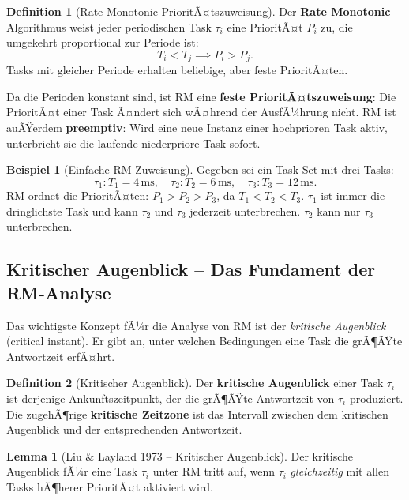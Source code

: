 ﻿\documentclass[a4paper,12pt]{report}
\theoremstyle{definition}
\newtheorem{definition}{Definition}[chapter]
\newtheorem{beispiel}{Beispiel}[chapter]
\newtheorem{lemma}{Lemma}[chapter]
\begin{document}
\begin{definition}[Rate Monotonic PrioritÃ¤tszuweisung]
	Der \textbf{Rate Monotonic} Algorithmus weist jeder periodischen Task $\tau_i$
	eine PrioritÃ¤t $P_i$ zu, die umgekehrt proportional zur Periode ist:
	\[
		T_i < T_j \implies P_i > P_j.
	\]
	Tasks mit gleicher Periode erhalten beliebige, aber feste PrioritÃ¤ten.
\end{definition}

Da die Perioden konstant sind, ist RM eine \textbf{feste PrioritÃ¤tszuweisung}: Die
PrioritÃ¤t einer Task Ã¤ndert sich wÃ¤hrend der AusfÃ¼hrung nicht. RM ist auÃŸerdem
\textbf{preemptiv}: Wird eine neue Instanz einer hochprioren Task aktiv, unterbricht
sie die laufende niederpriore Task sofort.

\begin{beispiel}[Einfache RM-Zuweisung]
	Gegeben sei ein Task-Set mit drei Tasks:
	\[
		\tau_1: T_1 = 4\,\text{ms}, \quad \tau_2: T_2 = 6\,\text{ms}, \quad \tau_3: T_3 = 12\,\text{ms}.
	\]
	RM ordnet die PrioritÃ¤ten: $P_1 > P_2 > P_3$, da $T_1 < T_2 < T_3$.
	$\tau_1$ ist immer die dringlichste Task und kann $\tau_2$ und $\tau_3$ jederzeit
	unterbrechen. $\tau_2$ kann nur $\tau_3$ unterbrechen.
\end{beispiel}

\subsection{Kritischer Augenblick -- Das Fundament der RM-Analyse}

Das wichtigste Konzept fÃ¼r die Analyse von RM ist der \emph{kritische Augenblick}
(critical instant). Er gibt an, unter welchen Bedingungen eine Task die grÃ¶ÃŸte
Antwortzeit erfÃ¤hrt.

\begin{definition}[Kritischer Augenblick]
	Der \textbf{kritische Augenblick} einer Task $\tau_i$ ist derjenige
	Ankunftszeitpunkt, der die grÃ¶ÃŸte Antwortzeit von $\tau_i$ produziert.
	Die zugehÃ¶rige \textbf{kritische Zeitzone} ist das Intervall zwischen dem
	kritischen Augenblick und der entsprechenden Antwortzeit.
\end{definition}

\begin{lemma}[Liu \& Layland 1973 -- Kritischer Augenblick]
	\label{lem:critical_instant}
	Der kritische Augenblick fÃ¼r eine Task $\tau_i$ unter RM tritt auf, wenn
	$\tau_i$ \emph{gleichzeitig} mit allen Tasks hÃ¶herer PrioritÃ¤t aktiviert wird.
\end{lemma}
\end{document}
